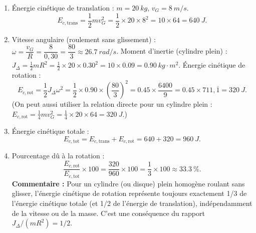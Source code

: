 \documentclass[11pt]{article}
\begin{document}
\begin{corrige}
\begin{enumerate}
\item Énergie cinétique de translation :
$m = \SI{20}{kg}$, $v_G = \SI{8}{m/s}$.
\[
E_{c,\text{trans}} = \frac{1}{2}mv_G^2 = \frac{1}{2} \times 20 \times 8^2 = 10 \times 64 = \SI{640}{J}.
\]
\item Vitesse angulaire (roulement sans glissement) : $\omega = \dfrac{v_G}{R} = \dfrac{8}{0,30} = \dfrac{80}{3} \approx \SI{26,7}{rad/s}$.
Moment d'inertie (cylindre plein) : $J_{\Delta} = \frac{1}{2}mR^2 = \frac{1}{2} \times 20 \times \num{0,30}^2 = 10 \times \num{0,09} = \SI{0,90}{kg\cdot m^2}$.
Énergie cinétique de rotation :
\[
E_{c,\text{rot}} = \frac{1}{2}J_{\Delta}\omega^2 = \frac{1}{2} \times \num{0,90} \times \left(\frac{80}{3}\right)^2 = \num{0,45} \times \frac{6400}{9} = \num{0,45} \times 711,\overline{1} = \SI{320}{J}.
\]
(On peut aussi utiliser la relation directe pour un cylindre plein : $E_{c,\text{rot}} = \frac{1}{4}mv_G^2 = \frac{1}{4} \times 20 \times 64 = \SI{320}{J}$.)
\item Énergie cinétique totale :
\[
E_{c,\text{tot}} = E_{c,\text{trans}} + E_{c,\text{rot}} = 640 + 320 = \SI{960}{J}.
\]
\item Pourcentage dû à la rotation :
\[
\frac{E_{c,\text{rot}}}{E_{c,\text{tot}}} \times 100 = \frac{320}{960} \times 100 = \frac{1}{3} \times 100 \approx \SI{33,3}{\%}.
\]
\textbf{Commentaire :} Pour un cylindre (ou disque) plein homogène roulant sans glisser, l'énergie cinétique de rotation représente toujours exactement 1/3 de l'énergie cinétique totale (et 1/2 de l'énergie de translation), indépendamment de la vitesse ou de la masse. C'est une conséquence du rapport $J_{\Delta}/(mR^2) = 1/2$.
\end{enumerate}
\end{corrige}
\end{document}

